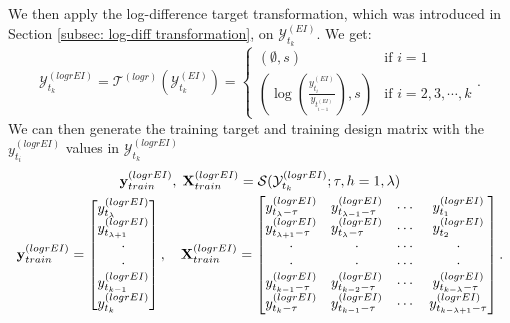 We then apply the log-difference target transformation, which was introduced in Section \ref{subsec: log-diff transformation}, on $\mathcal{Y}^{(EI)}_{t_k}$. We get:
\begin{equation*}
    \mathcal{Y}^{(logrEI)}_{t_k} = \mathcal{T}^{(logr)}(\mathcal{Y}^{(EI)}_{t_k}) = \begin{cases}
        (\emptyset, s)  &\text{if $i = 1$} \\
        (\log(\frac{y^{(EI)}_{t_i}}{y_{t^{(EI)}_{i-1}}}), s) &\text{if $i = 2, 3, \cdots, k$}
    \end{cases}.
\end{equation*}
We can then generate the training target and training design matrix with the $y^{(logrEI)}_{t_i}$ values in $\mathcal{Y}^{(logrEI)}_{t_k}$
\begin{gather*}
    \mathbf{y}^{(logrEI)}_{train}, \; \mathbf{X}^{(logrEI)}_{train} = \mathcal{S} (\mathcal{Y}^{(logrEI)}_{t_k} ; \tau, h=1, \lambda) \\
    \mathbf{y}^{(logrEI)}_{train} = \begin{bmatrix}
        y^{(logrEI)}_{t_\lambda}       \\
        y^{(logrEI)}_{t_{\lambda + 1}} \\
        \cdot               \\
        \cdot               \\
        y^{(logrEI)}_{t_{k-1}}         \\
        y^{(logrEI)}_{t_k}             \\
    \end{bmatrix}
    , \quad
    \mathbf{X}^{(logrEI)}_{train} = \begin{bmatrix}
        y^{(logrEI)}_{t_{\lambda} - \tau}   & y^{(logrEI)}_{t_{\lambda-1} - \tau} & \cdots & y^{(logrEI)}_{t_{1}} \\
        y^{(logrEI)}_{t_{\lambda+1} - \tau} & y^{(logrEI)}_{t_{\lambda} - \tau}   & \cdots & y^{(logrEI)}_{t_{2}} \\
        \cdot                    & \cdot                    & \cdots & \cdot     \\
        \cdot                    & \cdot                    & \cdots & \cdot     \\
        y^{(logrEI)}_{t_{k-1} - \tau}       & y^{(logrEI)}_{t_{k-2} - \tau}       & \cdots & y^{(logrEI)}_{t_{k - \lambda} - \tau}     \\
        y^{(logrEI)}_{t_{k} - \tau}         & y^{(logrEI)}_{t_{k-1} - \tau}       & \cdots & y^{(logrEI)}_{t_{k - \lambda + 1} - \tau} \\
    \end{bmatrix}.
\end{gather*}
